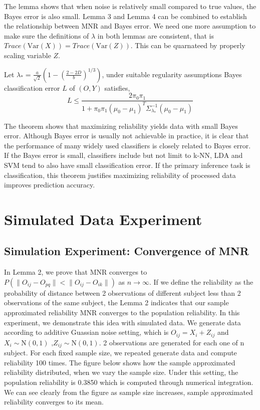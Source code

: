 \documentclass{article}
\begin{document}
The lemma shows that when noise is relatively small compared to true values, the Bayes error is also small. Lemma 3 and Lemma 4 can be combined to establish the relationship between MNR and Bayes error. We need one more assumption to make sure the definitions of $\lambda$ in both lemmas are consistent, that is $Trace(\text{Var}(X))=Trace(\text{Var}(Z))$. This can be quarnateed by properly scaling variable $Z$.
\begin{thm}
Let $\lambda_{\ast}=\frac{a}{\sqrt{2}} (1-(\frac{2-2D}{b})^{1/3} )$, under suitable regularity assumptions Bayes classification error $L$ of $(O,Y)$ satisfies,
\[ L \leq \frac{2\pi_0\pi_1}{1+\pi_0\pi_1(\mu_0-\mu_1)^T\Sigma_{\lambda_\ast}^{-1}(\mu_0-\mu_1)}\]
\end{thm} 
\noindent The theorem shows that maximizing reliability yields data with small Bayes error. Although Bayes error is usually not achievable in practice, it is clear that the performance of many widely used classifiers is closely related to Bayes error. If the Bayes error is small, classifiers include but not limit to k-NN, LDA and SVM tend to also have small classification error. If the primary inference task is classification, this theorem justifies maximizing reliability of processed data improves prediction accuracy.

\section{Simulated Data Experiment}


\subsection{Simulation Experiment: Convergence of MNR}
\noindent In Lemma 2, we prove that MNR converges to $P(\|O_{ij}-O_{pq}\| < \|O_{ij}-O_{ik}\|)$ as $n\rightarrow\infty$. If we define the reliability as the probability of distance between 2 observations of different subject less than 2 observations of the same subject, the Lemma 2 indicates that our sample approximated reliability MNR converges to the population reliability. In this experiment, we demonstrate this idea with simulated data. We generate data according to additive Guassian noise setting, which is $O_{ij}=X_i+Z_{ij}$ and $X_i \sim \text{N}(0,1) \text{ ,}Z_{ij} \sim \text{N}(0,1)$. 2 observations are generated for each one of n subject. For each fixed sample size, we repeated generate data and compute reliability 100 times. The figure below shows how the sample approximated reliability distributed, when we vary the sample size. Under this setting, the population reliability is 0.3850 which is computed through numerical integration. We can see clearly from the figure as sample size increases, sample approximated reliability converges to its mean.
\end{document}
